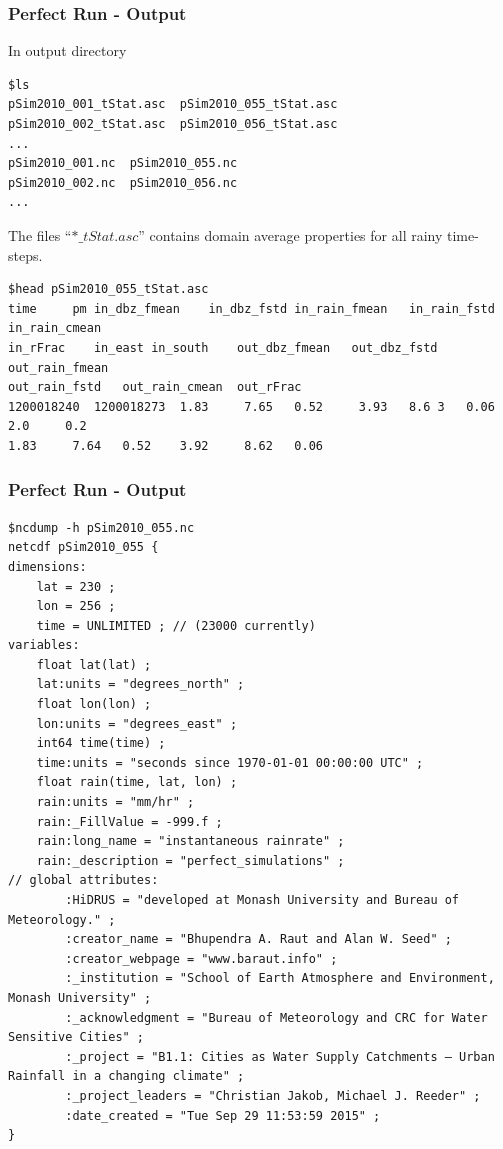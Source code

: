 \documentclass[aspectratio=169]{beamer}
\begin{document}
\begin{frame}[fragile]
\frametitle{Perfect Run - Output}
In output directory
\begin{lstlisting}[style=BashInputStyle]
$ls
pSim2010_001_tStat.asc  pSim2010_055_tStat.asc
pSim2010_002_tStat.asc  pSim2010_056_tStat.asc
...
pSim2010_001.nc  pSim2010_055.nc
pSim2010_002.nc  pSim2010_056.nc
...
\end{lstlisting}

The files ``$\ast\_tStat.asc$'' contains domain average properties for all rainy time-steps.
\begin{lstlisting}[style=BashInputStyle]
$head pSim2010_055_tStat.asc
time	 pm	in_dbz_fmean	in_dbz_fstd	in_rain_fmean	in_rain_fstd	in_rain_cmean
in_rFrac	in_east	in_south	out_dbz_fmean	out_dbz_fstd	out_rain_fmean	
out_rain_fstd	out_rain_cmean	out_rFrac
1200018240	1200018273	1.83	 7.65	0.52	 3.93	8.6 3	0.06	 2.0	 0.2 	
1.83	 7.64	0.52 	3.92	 8.62 	0.06
\end{lstlisting}

\end{frame}
%
%
%
%
%
\begin{frame}[fragile]
\frametitle{Perfect Run - Output}
\begin{lstlisting}[style=BashInputStyle]
$ncdump -h pSim2010_055.nc 
netcdf pSim2010_055 {
dimensions:
	lat = 230 ;
	lon = 256 ;
	time = UNLIMITED ; // (23000 currently)
variables:
	float lat(lat) ;
    lat:units = "degrees_north" ;
	float lon(lon) ;
    lon:units = "degrees_east" ;
	int64 time(time) ;
    time:units = "seconds since 1970-01-01 00:00:00 UTC" ;
	float rain(time, lat, lon) ;
    rain:units = "mm/hr" ;
    rain:_FillValue = -999.f ;
    rain:long_name = "instantaneous rainrate" ;
    rain:_description = "perfect_simulations" ;
// global attributes:
		:HiDRUS = "developed at Monash University and Bureau of Meteorology." ;
		:creator_name = "Bhupendra A. Raut and Alan W. Seed" ;
		:creator_webpage = "www.baraut.info" ;
		:_institution = "School of Earth Atmosphere and Environment, Monash University" ;
		:_acknowledgment = "Bureau of Meteorology and CRC for Water Sensitive Cities" ;
		:_project = "B1.1: Cities as Water Supply Catchments – Urban Rainfall in a changing climate" ;
		:_project_leaders = "Christian Jakob, Michael J. Reeder" ;
		:date_created = "Tue Sep 29 11:53:59 2015" ;
}

\end{lstlisting}


\end{frame}
%
%
%
%
%
\end{document}
